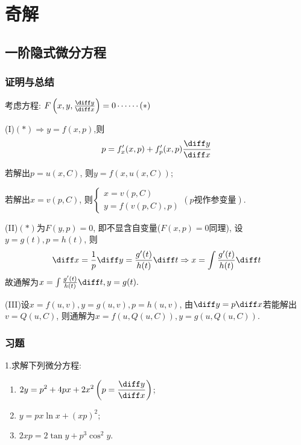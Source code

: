 \chapter{奇解}


\section{一阶隐式微分方程}


\subsection{证明与总结}


考虑方程: $F\left(x,y,\frac{\diff y}{\diff x}\right)=0\cdots\cdots(*)$

(I)$(*)\Rightarrow y=f(x,p)$,则
\[p=f'_x(x,p)+f'_p(x,p)\frac{\diff y}{\diff x}\]

若解出$p=u(x,C)$, 则$y=f(x,u(x,C))$;

若解出$x=v(p,C)$, 则$\begin{cases}
x=v(p,C)\\y=f(v(p,C),p)
\end{cases}(p视作参变量)$.

(II)$(*)$为$F(y,p)=0$, 即不显含自变量($F(x,p)=0$同理), 设$y=g(t),p=h(t)$, 则
\[\diff x=\frac{1}{p}\diff y=\frac{g'(t)}{h(t)}\diff t\Rightarrow x=\int\frac{g'(t)}{h(t)}\diff t\]
故通解为$x=\int\frac{g'(t)}{h(t)}\diff t,y=g(t).$

(III)设$x=f(u,v),y=g(u,v),p=h(u,v)$, 由$\diff y=p\diff x$若能解出$v=Q(u,C)$, 则通解为$x=f(u,Q(u,C)),y=g(u,Q(u,C))$.


\subsection{习题}


1.求解下列微分方程:
\begin{enumerate}[(1)]
\item $\displaystyle 2y=p^2+4px+2x^2\left(p=\frac{\diff y}{\diff x}\right)$;
\item $\displaystyle y=px\ln x+(xp)^2$;
\item $\displaystyle 2xp=2\tan y+p^3\cos^2y$.
\end{enumerate}

